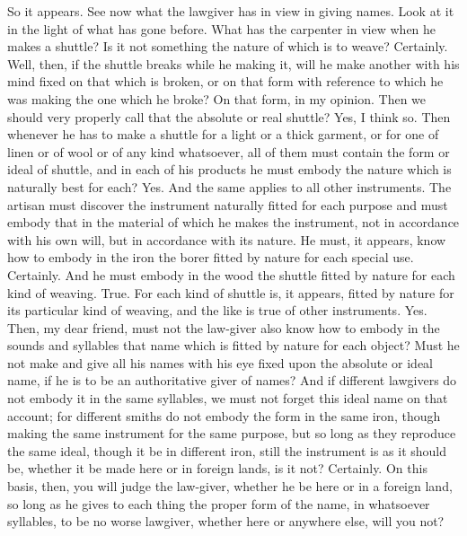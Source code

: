 \hermogenesspeaks
So it appears.
\socratesspeaks
See now what the lawgiver has in view in giving names. Look at it in the light of what has gone before. What has the carpenter in view when he makes a shuttle? Is it not something the nature of which is to weave?
\hermogenesspeaks
Certainly.
\socratesspeaks
Well, then, if the shuttle breaks while he making it,  will he make another with his mind fixed on that which is broken, or on that form with reference to which he was making the one which he broke?
\hermogenesspeaks
On that form, in my opinion.
\socratesspeaks
Then we should very properly call that the absolute or real shuttle?
\hermogenesspeaks
Yes, I think so.
\socratesspeaks
Then whenever he has to make a shuttle for a light or a thick garment, or for one of linen or of wool or of any kind whatsoever, all of them must contain the form or ideal of shuttle,  and in each of his products he must embody the nature which is naturally best for each?
\hermogenesspeaks
Yes.
\socratesspeaks
And the same applies to all other instruments. The artisan must discover the instrument naturally fitted for each purpose and must embody that in the material of which he makes the instrument, not in accordance with his own will, but in accordance with its nature. He must, it appears, know how to embody in the iron the borer fitted by nature for each special use.
\hermogenesspeaks
Certainly.
\socratesspeaks
And he must embody in the wood the shuttle fitted by nature for each kind of weaving.
\hermogenesspeaks
True. 
\socratesspeaks
For each kind of shuttle is, it appears, fitted by nature for its particular kind of weaving, and the like is true of other instruments.
\hermogenesspeaks
Yes.
\socratesspeaks
Then, my dear friend, must not the law-giver also know how to embody in the sounds and syllables that name which is fitted by nature for each object? Must he not make and give all his names with his eye fixed upon the absolute or ideal name, if he is to be an authoritative giver of names? And if different lawgivers do not embody it in the same syllables, we must not forget this ideal name on that account; for different smiths do not embody the form in the same iron,  though making the same instrument for the same purpose, but so long as they reproduce the same ideal,  though it be in different iron, still the instrument is as it should be, whether it be made here or in foreign lands, is it not?
\hermogenesspeaks
Certainly.
\socratesspeaks
On this basis, then, you will judge the law-giver, whether he be here or in a foreign land, so long as he gives to each thing the proper form of the name, in whatsoever syllables, to be no worse lawgiver, whether here or anywhere else, will you not?
